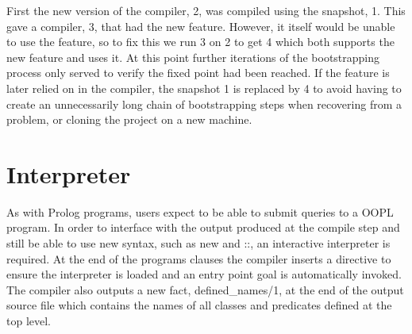 \documentclass[12pt,a4paper,twoside,openright]{report}
\newcommand{\tblocktextnm}[4]{
    {#1} \& {#4}   \& {#2} \\
    {}     \&  {#3}   \&      \\
}
\newcommand{\tblockoutline}[1]{
    \draw (#1-1-1.south west) |- (#1-1-3.north east) |- (#1-1-3.south west) |- (#1-2-2.south west) |- (#1-1-1.south west);
}
\newcommand{\wblocktext}[1]{
    {#1} \\
    {}\\
}
\newcommand{\wblockoutline}[1]{
    \draw (#1-1-1.south west) |- (#1-1-1.north east) -- (#1-1-1.south east) -- (#1-2-1.south) -- (#1-1-1.south west);
}
\newcommand{\wsupt}[2]{
	\node(mac#2) at (#2-2-2.south west) [wblock, anchor = mac#2-1-1.north west] {\wblocktext{#1}};
	\wblockoutline{mac#2};
}
\begin{document}
\begin{center}
\end{center}

First the new version of the compiler, 2, was compiled using the snapshot, 1. This gave a compiler, 3, that had the new feature. However, it itself would be unable to use the feature, so to fix this we run 3 on 2 to get 4 which both supports the new feature and uses it. At this point further iterations of the bootstrapping process only served to verify the fixed point had been reached. If the feature is later relied on in the compiler, the snapshot 1 is replaced by 4 to avoid having to create an unnecessarily long chain of bootstrapping steps when recovering from a problem, or cloning the project on a new machine.

\section{Interpreter}

As with Prolog programs, users expect to be able to submit queries to a OOPL program. In order to interface with the output produced at the compile step and still be able to use new syntax, such as new and ::, an interactive interpreter is required. At the end of the programs clauses the compiler inserts a directive to ensure the interpreter is loaded and an entry point goal is automatically invoked. The compiler also outputs a new fact, defined_names/1, at the end of the output source file which contains the names of all classes and predicates defined at the top level.
\end{document}
